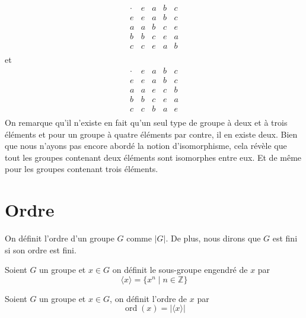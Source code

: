 \[
\begin{array}{c|cccc}
\cdot & e & a & b & c \\ \hline
 e & e & a & b & c \\
 a & a & b & c & e \\
 b & b & c & e & a \\
 c & c & e & a & b \\
\end{array}
\]
et
\[
\begin{array}{c|cccc}
\cdot & e & a & b & c \\ \hline
 e & e & a & b & c \\
 a & a & e & c & b \\
 b & b & c & e & a \\
 c & c & b & a & e \\
\end{array}
\]
On remarque qu'il n'existe en fait qu'un seul type de groupe à deux et à trois éléments et pour un groupe à quatre éléments par contre, il en existe deux. Bien que nous n'ayons pas encore abordé la notion d'isomorphisme, cela révèle que tout les groupes contenant deux éléments sont isomorphes entre eux. Et de même pour les groupes contenant trois éléments.

\section{Ordre}

\begin{definition}
    On définit l'ordre d'un groupe $G$ comme $\left| G \right|$. De plus, nous dirons que $G$ est fini si son ordre est fini.
\end{definition}

\begin{definition}
    Soient $G$ un groupe et $x\in G$ on définit le sous-groupe engendré de $x$ par
    \begin{equation*}
        \langle x \rangle = \{x^{n}\mid n\in \mathbb{Z}\}
    \end{equation*}
\end{definition}


\begin{definition}
    Soient $G$ un groupe et $x\in G$, on définit l'ordre de $x$ par 
    \begin{equation*}
        \operatorname{ord}(x) = \left| \langle x \rangle \right|
    \end{equation*}
\end{definition}

